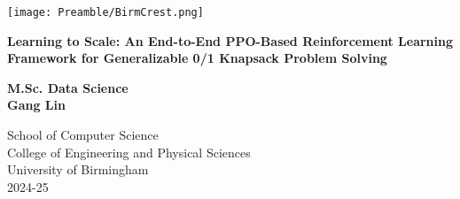 
\thispagestyle{empty}

\begin{spacing}{2}
	\begin{center}
		\texttt{[image: Preamble/BirmCrest.png]}
	\end{center}
	\vspace{10mm}
	\begin{center}
		\textbf{\Large Learning to Scale: An End-to-End PPO-Based Reinforcement Learning Framework for Generalizable 0/1 Knapsack Problem Solving}
		\vspace{10mm}
	\end{center}
	\begin{center}
		\textbf{\large M.Sc. Data Science}
		\vspace{20mm}
		\\\textbf{\Large Gang Lin}
		\vspace{30mm}
	\end{center}
	\begin{center}
		{\large School of Computer Science}
		\\ {\large College of Engineering and Physical Sciences}
		\\ {\large University of Birmingham}
		\\ {\large 2024-25}
	\end{center}
\end{spacing}


